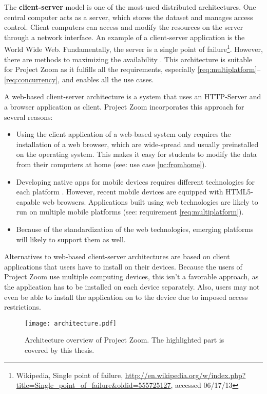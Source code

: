 The \textbf{client-server} \cite{Berson_1996} model is one of the most-used distributed architectures. One central computer acts as a server, which stores the dataset and manages access control. Client computers can access and modify the resources on the server through a network interface. An example of a client-server application is the World Wide Web. Fundamentally, the server is a single point of failure\footnote{Wikipedia, Single point of failure, \url{http://en.wikipedia.org/w/index.php?title=Single_point_of_failure&oldid=555725127}, accessed 06/17/13}. However, there are methods to maximizing the availability \cite{Gray_1991} \cite{Colyer_2000}. This architecture is suitable for Project Zoom as it fulfills all the requirements, especially \ref{req:multiplatform}–\ref{req:concurrency}, and enables all the use cases.

A web-based client-server architecture is a system that uses an HTTP-Server \cite{RFC2616} and a brow\-ser application as client. Project Zoom incorporates this approach for several reasons:
\begin{itemize}
\item Using the client application of a web-based system only requires the installation of a web browser, which are wide-spread and usually preinstalled on the operating system. This makes it easy for students to modify the data from their computers at home (see: use case \ref{uc:fromhome}).
\item Developing native apps for mobile devices requires different technologies for each platform \cite{Charland_2011}. However, recent mobile devices are equipped with HTML5-capable \cite{W3C_HTML5} web browsers. Applications built using web technologies are likely to run on multiple mobile platforms (see: requirement \ref{req:multiplatform}).
\item Because of the standardization of the web technologies, emerging platforms will likely to support them as well.
\end{itemize}

Alternatives to web-based client-server architectures are based on client applications that users have to install on their devices. Because the users of Project Zoom use multiple computing devices, this isn't a favorable approach, as the application has to be installed on each device separately. Also, users may not even be able to install the application on to the device due to imposed access restrictions.

\begin{figure}
\begin{center}
\texttt{[image: architecture.pdf]}
\caption{Architecture overview of Project Zoom. The highlighted part is covered by this thesis.}
\label{fig:CompleteArchitectureDiagram}
\end{center}
\end{figure}

